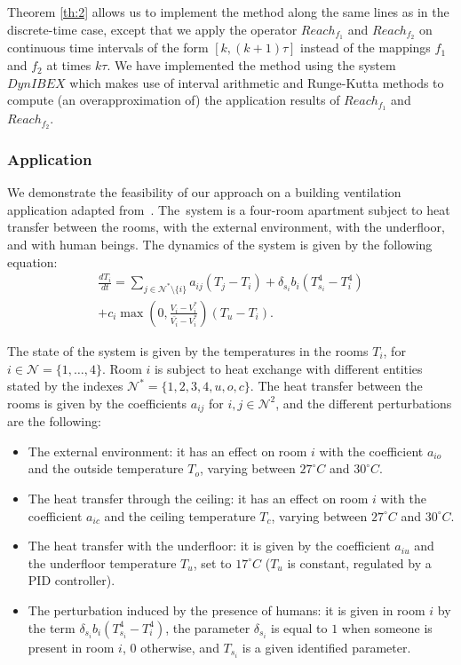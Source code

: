 Theorem \ref{th:2} allows us to implement the method along the same lines as in the discrete-time case, except that we apply the operator $Reach_{f_1}$ and $Reach_{f_2}$
on continuous time intervals of the form $[k,(k+1)\tau]$
instead of the mappings $f_1$ and $f_2$ at times $k\tau$.
We have implemented the method
using the system $DynIBEX$
\cite{dynibex,dit2016validated} which makes use of interval arithmetic \cite{Moore66}
and Runge-Kutta methods to compute
(an overapproximation of)
the application results of 
$Reach_{f_1}$ and $Reach_{f_2}$.

\subsubsection{Application}


We demonstrate the feasibility of our approach on a building
ventilation application adapted from~\cite{meyer:tel-01232640}.
The~system is a four-room apartment subject to heat transfer between
the rooms, with the external environment, with the underfloor, and
with human beings.  The dynamics of the system is given by the
following equation:
\begin{multline}
 \frac{d T_i}{dt} = \sum_{j \in \mathcal{N}^\text{*}\setminus \{i\}} a_{ij} (T_j -
 T_i) + \delta_{s_i} b_i (T_{s_i}^4 - T_i ^4 ) \\ + c_i
 \max\left(0,\frac{V_i - V_i^\text{*}}{\bar{ V_i} -
   V_i^{\text{*}}}\right)(T_u - T_i).
\end{multline}

The state of the system is given by the temperatures in the rooms
$T_i$, for $i \in \mathcal{N} = \{ 1 , \dots , 4 \}$.  Room $i$ is
subject to heat exchange with different entities stated by the indexes
$\mathcal{N}^\text{*} = \{1,2,3,4,u,o,c \}$.
%
The heat
transfer between the rooms is given by the coefficients $a_{ij}$ for
$i,j \in  \mathcal{N}^2$, and the different perturbations are the following:
\begin{itemize}
 \item The external environment: it has an effect on room $i$ with the
   coefficient $a_{io}$ and the outside temperature $T_o$, varying
   between $27^\circ C$ and $30^\circ C$.
  \item The heat transfer through the ceiling: it has an effect on
    room $i$ with the coefficient $a_{ic}$ and the ceiling temperature
    $T_c$, varying between $27^\circ C$ and $30^\circ C$.
  \item The heat transfer with the underfloor: it is given by the
    coefficient $a_{iu}$ and the underfloor temperature $T_u$, set to
    $17^\circ C$ ($T_u$ is constant, regulated by a PID controller).
  \item The perturbation induced by the presence of humans: it is
    given in room $i$ by the term $\delta_{s_i} b_i (T_{s_i}^4 - T_i
    ^4 )$, the parameter $\delta_{s_i}$ is equal to $1$ when someone
    is present in room $i$, $0$ otherwise, and $T_{s_i}$ is a given
    identified parameter.
\end{itemize}

